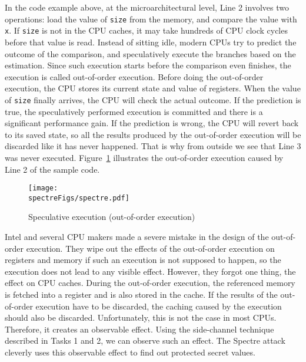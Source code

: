 In the code example above, at the microarchitectural level, Line 2 involves
two operations: load the value of \texttt{size} from the memory, 
and compare the value with \texttt{x}. If \texttt{size} is not in the CPU
caches, it may take hundreds of CPU clock cycles before that value is read.
Instead of sitting idle, modern CPUs try to predict the outcome 
of the comparison, and speculatively execute the branches based on
the estimation. Since such execution starts before the comparison even finishes,
the execution is called out-of-order execution. 
Before doing the out-of-order execution,  
the CPU stores its current state and value of registers. 
When the value of \texttt{size} finally arrives, 
the CPU will check the actual outcome. If the prediction is true, the speculatively
performed execution is committed and there is a significant performance gain. If the prediction
is wrong, the CPU will revert back to its saved state, 
so all the results produced by the out-of-order execution will be discarded like
it has never happened.  That is why from outside we see that Line 3 was
never executed.
Figure~\ref{spectre:fig:spectre} illustrates the out-of-order execution
caused by Line 2 of the sample code.


\begin{figure}[htb]
\centering
\texttt{[image: \\spectreFigs/spectre.pdf]}
\caption{Speculative execution (out-of-order execution)}
\label{spectre:fig:spectre}
\end{figure}


Intel and several CPU makers made a severe mistake in the design of the out-of-order execution.
They wipe out the effects of the out-of-order execution on registers and memory
if such an execution is not supposed to happen, so the execution does not lead to
any visible effect. However, they forgot one thing, the effect on CPU caches.
During the out-of-order execution, the referenced memory is fetched into a register and is
also stored in the cache. If the results of the out-of-order execution have to be discarded,
the caching caused by the execution should also be discarded. Unfortunately, this is
not the case in most CPUs. Therefore, it creates an observable effect.
Using the side-channel technique described in Tasks 1 and 2, we
can observe such an effect. The Spectre attack cleverly uses this
observable effect to find out protected secret values.



